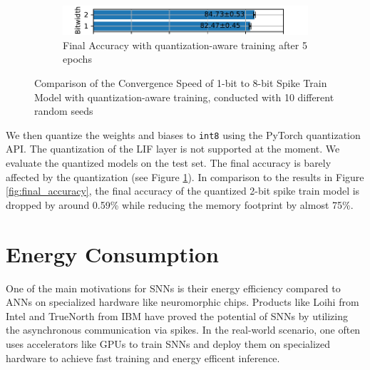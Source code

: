 \begin{figure}[!htpb]
\begin{subfigure}[H]{\textwidth}
\begin{subfigure}[H]{\textwidth}
            \end{subfigure}
        \end{subfigure}
        \hfill
        \begin{subfigure}[H]{\textwidth}
            \centering
            \includegraphics[width=\textwidth]{../quantized/FashionMNIST/plots/fashionmnist_final_acc_horizontal.pdf}
            \caption{Final Accuracy with quantization-aware training after 5 epochs}
            \label{fig:quantization_aware_final_acc}
        \end{subfigure}
        \caption{Comparison of the Convergence Speed of 1-bit to 8-bit Spike Train Model with quantization-aware training, conducted with 10 different random seeds}
        \label{fig:quantization_aware}
    \end{figure}

    We then quantize the weights and biases to \verb|int8| using the PyTorch quantization API. The quantization of the LIF layer is not supported at the moment. We evaluate the quantized models on the test set. The final accuracy is barely affected by the quantization (see Figure \ref{fig:quantization_aware_final_acc}). In comparison to the results in Figure \ref{fig:final_accuracy}, the final accuracy of the quantized 2-bit spike train model is dropped by around 0.59\% while reducing the memory footprint by almost 75\%.

\section{Energy Consumption}
\label{sec:energy-consumption}
    One of the main motivations for SNNs is their energy efficiency compared to ANNs on specialized hardware like neuromorphic chips. Products like Loihi from Intel \cite{8259423} and TrueNorth from IBM \cite{7229264} have proved the potential of SNNs by utilizing the asynchronous communication via spikes. In the real-world scenario, one often uses accelerators like GPUs to train SNNs and deploy them on specialized hardware to achieve fast training and energy efficent inference. 

